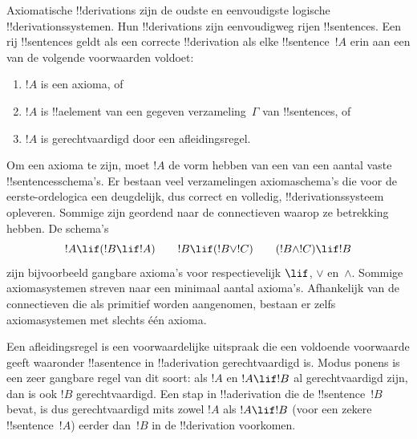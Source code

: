 \documentclass[openany]{memoir}
\begin{document}
\begingroup
\def\olfilename{OLP-0068}
\def\olfilepath{content/first-order-logic/proof-systems/}
\hypertarget{unit-OLP-0068}{}



      {}
      {}


Axiomatische !!{derivation}s zijn de oudste en eenvoudigste logische
!!{derivation}ssystemen. Hun !!{derivation}s zijn eenvoudigweg rijen
!!{sentence}s. Een rij !!{sentence}s geldt als een correcte
!!{derivation} als elke !!{sentence}~$!A$ erin aan een van de volgende
voorwaarden voldoet:
\begin{enumerate}
\item $!A$ is een axioma, of
\item $!A$ is !!a{element} van een gegeven verzameling~$\Gamma$ van !!{sentence}s, of
\item $!A$ is gerechtvaardigd door een afleidingsregel.
\end{enumerate}
Om een axioma te zijn, moet $!A$ de vorm hebben van een van een aantal
vaste !!{sentence}sschema's. Er bestaan veel verzamelingen
axiomaschema's die voor de eerste-ordelogica een deugdelijk, dus correct
en volledig, !!{derivation}ssysteem opleveren. Sommige zijn geordend
naar de connectieven waarop ze betrekking hebben. De schema's
\[
!A \lif (!B \lif !A) \qquad !B \lif (!B \lor !C) \qquad (!B \land !C) \lif !B
\]
zijn bijvoorbeeld gangbare axioma's voor respectievelijk $\lif$,
$\lor$ en~$\land$. Sommige axiomasystemen streven naar een minimaal
aantal axioma's. Afhankelijk van de connectieven die als primitief
worden aangenomen, bestaan er zelfs axiomasystemen met slechts één
axioma.

Een afleidingsregel is een voorwaardelijke uitspraak die een voldoende
voorwaarde geeft waaronder !!a{sentence} in !!a{derivation}
gerechtvaardigd is. Modus ponens is een zeer gangbare regel van dit
soort: als $!A$ en $!A \lif !B$ al gerechtvaardigd zijn, dan is ook
$!B$ gerechtvaardigd. Een stap in !!a{derivation} die de
!!{sentence}~$!B$ bevat, is dus gerechtvaardigd mits zowel $!A$ als
$!A \lif !B$ (voor een zekere !!{sentence}~$!A$) eerder dan~$!B$ in de
!!{derivation} voorkomen.
\end{document}
